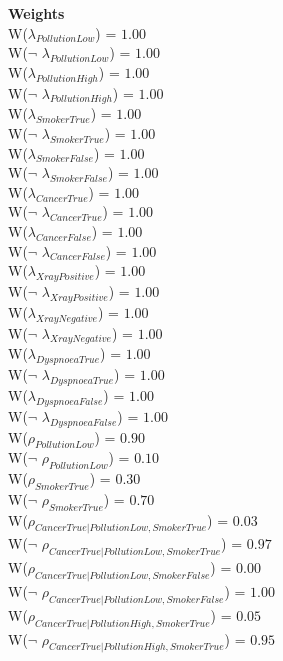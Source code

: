 \documentclass[a4paper,10pt]{report}
\begin{document}
\textbf{Weights}\\
W($\lambda_{PollutionLow}$) = $1.00$\\ 
W($\neg$ $\lambda_{PollutionLow}$) = $1.00$\\ 
W($\lambda_{PollutionHigh}$) = $1.00$\\ 
W($\neg$ $\lambda_{PollutionHigh}$) = $1.00$\\ 
W($\lambda_{SmokerTrue}$) = $1.00$\\ 
W($\neg$ $\lambda_{SmokerTrue}$) = $1.00$\\ 
W($\lambda_{SmokerFalse}$) = $1.00$\\ 
W($\neg$ $\lambda_{SmokerFalse}$) = $1.00$\\ 
W($\lambda_{CancerTrue}$) = $1.00$\\ 
W($\neg$ $\lambda_{CancerTrue}$) = $1.00$\\ 
W($\lambda_{CancerFalse}$) = $1.00$\\ 
W($\neg$ $\lambda_{CancerFalse}$) = $1.00$\\ 
W($\lambda_{XrayPositive}$) = $1.00$\\ 
W($\neg$ $\lambda_{XrayPositive}$) = $1.00$\\ 
W($\lambda_{XrayNegative}$) = $1.00$\\ 
W($\neg$ $\lambda_{XrayNegative}$) = $1.00$\\ 
W($\lambda_{DyspnoeaTrue}$) = $1.00$\\ 
W($\neg$ $\lambda_{DyspnoeaTrue}$) = $1.00$\\ 
W($\lambda_{DyspnoeaFalse}$) = $1.00$\\ 
W($\neg$ $\lambda_{DyspnoeaFalse}$) = $1.00$\\ 
W($\rho_{PollutionLow}$) = $0.90$\\ 
W($\neg$ $\rho_{PollutionLow}$) = $0.10$\\ 
W($\rho_{SmokerTrue}$) = $0.30$\\ 
W($\neg$ $\rho_{SmokerTrue}$) = $0.70$\\ 
W($\rho_{CancerTrue|PollutionLow,SmokerTrue}$) = $0.03$\\ 
W($\neg$ $\rho_{CancerTrue|PollutionLow,SmokerTrue}$) = $0.97$\\ 
W($\rho_{CancerTrue|PollutionLow,SmokerFalse}$) = $0.00$\\ 
W($\neg$ $\rho_{CancerTrue|PollutionLow,SmokerFalse}$) = $1.00$\\ 
W($\rho_{CancerTrue|PollutionHigh,SmokerTrue}$) = $0.05$\\ 
W($\neg$ $\rho_{CancerTrue|PollutionHigh,SmokerTrue}$) = $0.95$\\ 
\end{document}
